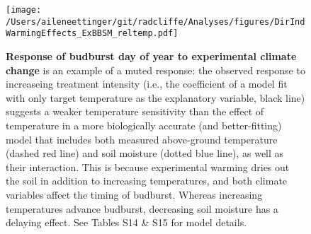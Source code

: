 \documentclass{article}
\begin{document}
\begin{figure}[h]
 \texttt{[image: /Users/aileneettinger/git/radcliffe/Analyses/figures/DirIndWarmingEffects\_ExBBSM\_reltemp.pdf]} 
 \caption{\textbf{Response of budburst day of year to experimental climate change} is an example of a muted response: the observed response to increaseing treatment intensity (i.e., the coefficient of a model fit with only target temperature as the explanatory variable, black line) suggests a weaker temperature sensitivity than the effect of temperature in a more biologically accurate (and better-fitting) model that includes both measured above-ground temperature (dashed red line) and soil moisture (dotted blue line), as well as their interaction. This is because experimental warming dries out the soil in addition to increasing temperatures, and both climate variables affect the timing of budburst. Whereas increasing temperatures advance budburst, decreasing soil moisture has a delaying effect. See Tables S14 \& S15 for model details.} 
\label{fig:phen}
\end{figure}
  
\end{document}
